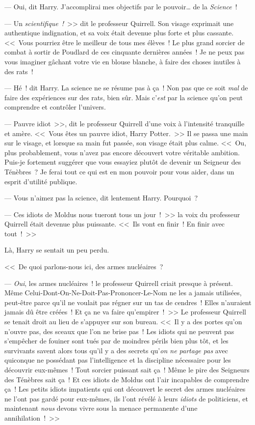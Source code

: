 --- Oui, dit Harry. J'accomplirai mes objectifs par le pouvoir… de la \emph{Science}~!

--- Un \emph{scientifique~!}~>> dit le professeur Quirrell. Son visage exprimait une authentique indignation, et sa voix était devenue plus forte et plus cassante. <<~Vous pourriez être le meilleur de tous mes élèves~! Le plus grand sorcier de combat à sortir de Poudlard de ces cinquante dernières années~! Je ne peux pas vous imaginer gâchant votre vie en blouse blanche, à faire des choses inutiles à des rats~!

--- Hé~! dit Harry. La science ne se résume pas à ça~! Non pas que ce soit \emph{mal} de faire des expériences sur des rats, bien sûr. Mais c'\emph{est} par la science qu'on peut comprendre et contrôler l'univers.

--- Pauvre idiot~>>, dit le professeur Quirrell d'une voix à l'intensité tranquille et amère. <<~Vous êtes un pauvre idiot, Harry Potter.~>> Il se passa une main sur le visage, et lorsque sa main fut passée, son visage était plus calme. <<~Ou, plus probablement, vous n'avez pas encore découvert votre véritable ambition. Puis-je fortement suggérer que vous essayiez plutôt de devenir un Seigneur des Ténèbres~? Je ferai tout ce qui est en mon pouvoir pour vous aider, dans un esprit d'utilité publique.

--- Vous n'aimez pas la science, dit lentement Harry. Pourquoi~?

--- Ces idiots de Moldus nous tueront tous un jour~!~>> la voix du professeur Quirrell était devenue plus puissante. <<~Ils vont en finir~! En finir avec tout~!~>>

Là, Harry se sentait un peu perdu.

<<~De quoi parlons-nous ici, des armes nucléaires~?

--- \emph{Oui}, les armes nucléaires~! le professeur Quirrell criait presque à présent. Même Celui-Dont-On-Ne-Doit-Pas-Prononcer-Le-Nom ne les a jamais utilisées, peut-être parce qu'il ne voulait pas régner sur un tas de cendres~! Elles n'auraient jamais dû être créées~! Et ça ne va faire qu'empirer~!~>> Le professeur Quirrell se tenait droit au lieu de s'appuyer sur son bureau. <<~Il y a des portes qu'on n'ouvre pas, des sceaux que l'on ne brise pas~! Les idiots qui ne peuvent pas s'empêcher de fouiner sont tués par de moindres périls bien plus tôt, et les survivants savent alors tous qu'il y a des secrets qu'\emph{on ne partage pas} avec quiconque ne possédant pas l'intelligence et la discipline nécessaire pour les découvrir eux-mêmes~! Tout sorcier puissant sait ça~! Même le pire des Seigneurs des Ténèbres sait ça~! Et ces idiots de Moldus ont l'air incapables de comprendre ça~! Les petits idiots impatients qui ont découvert le secret des armes nucléaires ne l'ont pas gardé pour eux-mêmes, ils l'ont révélé à leurs \emph{idiots} de politiciens, et maintenant \emph{nous} devons vivre sous la menace permanente d'une annihilation~!~>>

